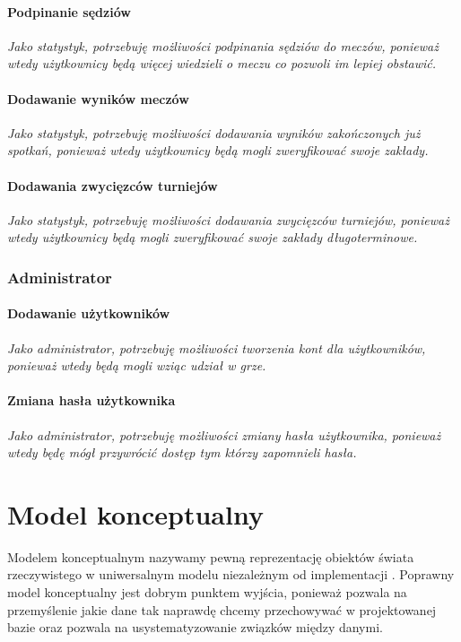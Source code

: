 \documentclass{mwrep}[15pt]
\begin{document}
\subsubsection{Podpinanie sędziów}
\emph{Jako statystyk, potrzebuję możliwości podpinania sędziów do meczów, ponieważ wtedy użytkownicy będą więcej wiedzieli o meczu co pozwoli im lepiej obstawić.}

\subsubsection{Dodawanie wyników meczów}
\emph{Jako statystyk, potrzebuję możliwości dodawania wyników zakończonych już spotkań, ponieważ wtedy użytkownicy będą mogli zweryfikować swoje zakłady.}

\subsubsection{Dodawania zwycięzców turniejów}
\emph{Jako statystyk, potrzebuję możliwości dodawania zwycięzców turniejów, ponieważ wtedy użytkownicy będą mogli zweryfikować swoje zakłady długoterminowe.}


\subsection{Administrator}
\subsubsection{Dodawanie użytkowników}
\emph{Jako administrator, potrzebuję możliwości tworzenia kont dla użytkowników, ponieważ wtedy będą mogli wziąc udział w grze.}

\subsubsection{Zmiana hasła użytkownika}
\emph{Jako administrator, potrzebuję możliwości zmiany hasła użytkownika, ponieważ wtedy będę mógł przywrócić dostęp tym którzy zapomnieli hasła.}


\chapter{Model konceptualny}
Modelem konceptualnym nazywamy pewną reprezentację obiektów świata rzeczywistego 
w uniwersalnym modelu niezależnym od implementacji \cite{Wrembel1}. Poprawny model 
konceptualny jest dobrym punktem wyjścia, ponieważ pozwala na przemyślenie jakie
dane tak naprawdę chcemy przechowywać w projektowanej bazie oraz pozwala na usystematyzowanie
związków między danymi.
\end{document}
